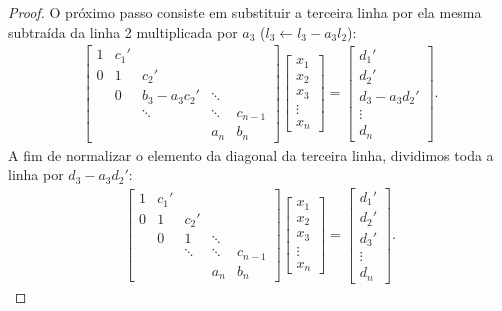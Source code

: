 \begin{proof}
O próximo passo consiste em substituir a terceira linha por ela mesma subtraída da linha 2 multiplicada por $a_3$ ($l_3\leftarrow l_3-a_3l_2$):
\begin{eqnarray*} \begin{bmatrix}
   {1} & {c_1'} & {   } & {   } & {   } \\
   {0} & {1} & {c_2'} & {   } & {   } \\
   {   } & { 0 } & {b_3-a_3 c_2'} & \ddots & {   } \\
   {   } & {   } & \ddots & \ddots & {c_{n-1}}\\
   {   } & {   } & {   } & {a_n} & {b_n}
\end{bmatrix}
\begin{bmatrix}
   {x_1 }  \\
   {x_2 }  \\
   {x_3 }  \\
   \vdots   \\
   {x_n }
\end{bmatrix}
=
\begin{bmatrix}
   {d_1' }  \\
   {d_2' }  \\
   {d_3 - a_3d_2'}  \\
   \vdots   \\
   {d_n }
\end{bmatrix}.
\end{eqnarray*}
A fim de normalizar o elemento da diagonal da terceira linha, dividimos toda a linha por $d_3 - a_3d_2'$:
\begin{eqnarray*} \begin{bmatrix}
   {1} & {c_1'} & {   } & {   } & {   } \\
   {0} & {1} & {c_2'} & {   } & {   } \\
   {   } & { 0 } & {1} & \ddots & {   } \\
   {   } & {   } & \ddots & \ddots & {c_{n-1}}\\
   {   } & {   } & {   } & {a_n} & {b_n}
\end{bmatrix}
\begin{bmatrix}
   {x_1 }  \\
   {x_2 }  \\
   {x_3 }  \\
   \vdots   \\
   {x_n }
\end{bmatrix}
=
\begin{bmatrix}
   {d_1' }  \\
   {d_2' }  \\
   {d_3'}  \\
   \vdots   \\
   {d_n }
\end{bmatrix}.
\end{eqnarray*}


\end{proof}
